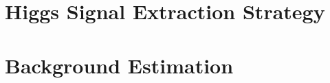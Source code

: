 \documentclass{cmspaper}
\begin{document}
\clearpage    
\section{Higgs Signal Extraction Strategy}

\clearpage
\section{Background Estimation}
\end{document}
